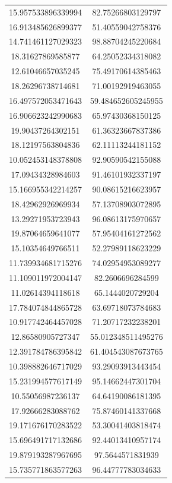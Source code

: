 \begin{table}
\begin{tabular}{cc}
15.957533896339994 & 82.75266803129797 \\
16.913485626899377 & 51.40559042758376 \\
14.741461127029323 & 98.88704245220684 \\
18.31627869585877 & 64.25052334318082 \\
12.61046657035245 & 75.49170614385463 \\
18.26296738714681 & 71.00192919463055 \\
16.497572053471643 & 59.484652605245955 \\
16.906623242990683 & 65.97430368150125 \\
19.90437264302151 & 61.36323667837386 \\
18.12197563804836 & 62.11113244181152 \\
10.052453148378808 & 92.90590542155088 \\
17.09434328984603 & 91.46101932337197 \\
15.166955342214257 & 90.08615216623957 \\
18.42962926969934 & 57.13708903072895 \\
13.29271953723943 & 96.08613175970657 \\
19.87064659641077 & 57.95404161272562 \\
15.10354649766511 & 52.27989118623229 \\
11.739934681715276 & 74.02954953089277 \\
11.109011972004147 & 82.2606696284599 \\
11.02614394118618 & 65.1444020729204 \\
17.784074844865728 & 63.69718073784683 \\
10.917742464457028 & 71.20717232238201 \\
12.86580905727347 & 55.012348511495276 \\
12.391784786395842 & 61.404543087673765 \\
10.398882646717029 & 93.29093913443454 \\
15.231994577617149 & 95.14662447301704 \\
10.55056987236137 & 64.64190086181395 \\
17.92666283088762 & 75.87460141337668 \\
19.171676170283522 & 53.30041403818474 \\
15.696491717132686 & 92.44013410957174 \\
19.879193287967695 & 97.5644571831939 \\
15.735771863577263 & 96.44777783034633 \\

\end{tabular}
\end{table}
